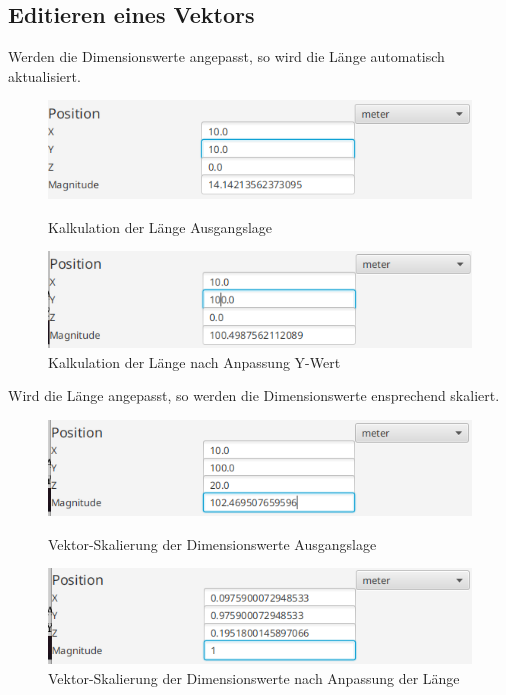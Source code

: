 \subsection{Editieren eines Vektors}
Werden die Dimensionswerte angepasst, so wird die Länge automatisch aktualisiert.

\begin{figure}[H]
	\centering
	\begin{minipage}[b]{0.45\textwidth}
		\includegraphics[width=\textwidth]{res/vecedit1.png}
		\caption{Kalkulation der Länge Ausgangslage}
	\end{minipage}
	\hfill
	\begin{minipage}[b]{0.45\textwidth}
		\includegraphics[width=\textwidth]{res/vecedit2.png}
		\caption{Kalkulation der Länge nach Anpassung Y-Wert}
	\end{minipage}
\end{figure}

Wird die Länge angepasst, so werden die Dimensionswerte ensprechend skaliert.

\begin{figure}[H]
	\centering
	\begin{minipage}[b]{0.45\textwidth}
		\includegraphics[width=\textwidth]{res/vecscale1.png}
		\caption{Vektor-Skalierung der Dimensionswerte Ausgangslage}
	\end{minipage}
	\hfill
	\begin{minipage}[b]{0.45\textwidth}
		\includegraphics[width=\textwidth]{res/vecscale2.png}
		\caption{Vektor-Skalierung der Dimensionswerte nach Anpassung der Länge}
	\end{minipage}
\end{figure}

